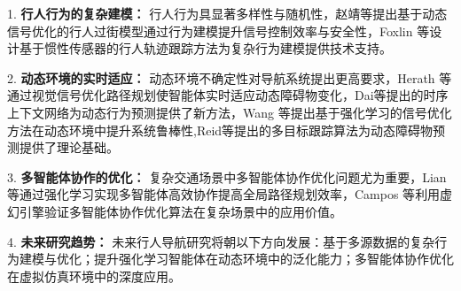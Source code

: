 1. \textbf{行人行为的复杂建模：} 行人行为具显著多样性与随机性，赵靖等\cite{zhao2014crossing}提出基于动态信号优化的行人过街模型通过行为建模提升信号控制效率与安全性，Foxlin 等\cite{foxlin2005tracking}设计基于惯性传感器的行人轨迹跟踪方法为复杂行为建模提供技术支持。

2. \textbf{动态环境的实时适应：} 动态环境不确定性对导航系统提出更高要求，Herath 等\cite{herath2020ronin}通过视觉信号优化路径规划使智能体实时适应动态障碍物变化，Dai等\cite{dai2017temporalcontext}提出的时序上下文网络为动态行为预测提供了新方法，Wang 等\cite{wang2013densetrajectory}提出基于强化学习的信号优化方法在动态环境中提升系统鲁棒性,Reid等\cite{reid1980tracking}提出的多目标跟踪算法为动态障碍物预测提供了理论基础。

3. \textbf{多智能体协作的优化：} 复杂交通场景中多智能体协作优化问题尤为重要，Lian 等\cite{lian2023inverseql}通过强化学习实现多智能体高效协作提高全局路径规划效率，Campos 等\cite{campos2021orbslam3}利用虚幻引擎验证多智能体协作优化算法在复杂场景中的应用价值。

4. \textbf{未来研究趋势：} 未来行人导航研究将朝以下方向发展：基于多源数据的复杂行为建模与优化；提升强化学习智能体在动态环境中的泛化能力；多智能体协作优化在虚拟仿真环境中的深度应用。

